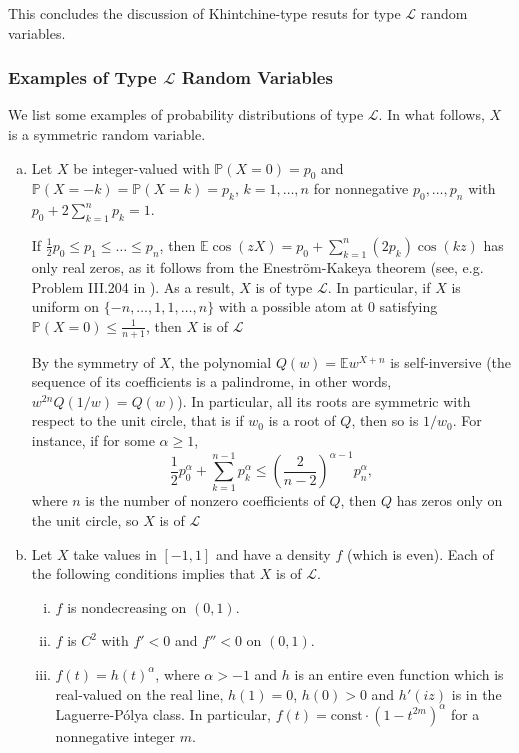 \documentclass[10pt]{article}
\newcommand{\E}{\mathbb{E}}
\newcommand{\1}{\textbf{1}}
\newcommand{\sL}{\mathcal{L}}
\newcommand{\p}[1]{\mathbb{P}\left( #1 \right)}
\theoremstyle{remark}
\theoremstyle{definition}
\begin{document}
This concludes the discussion of Khintchine-type resuts for type $\mathcal{L}$ random variables.

\subsubsection{Examples of Type $\mathcal{L}$ Random Variables}

We list some examples of probability distributions of type $\mathcal{L}$. In what follows, $X$ is a symmetric random variable.

\begin{enumerate}[(a)]

\item 
Let $X$ be integer-valued with $\p{X = 0} = p_0$ and $\p{X = -k} = \p{X = k} = p_k$, $k = 1, \dots, n$ for nonnegative $p_0, \dots, p_n$ with $p_0 + 2\sum_{k=1}^n p_k = 1$. 

If $\frac{1}{2}p_0 \leq p_1 \leq \dots \leq p_n$, then $\E \cos(zX) = p_0 + \sum_{k=1}^n (2p_k)\cos(kz)$ has only real zeros, as it follows from the Enestr\"om-Kakeya theorem (see, e.g. Problem III.204 in \cite{PS1}). As a result, $X$ is of type $\sL$. In particular, if $X$ is uniform on $\{-n,\dots, 1, 1, \dots, n\}$ with a possible atom at $0$ satisfying $\p{X = 0} \leq \frac{1}{n+1}$, then $X$ is of $\mathcal{L}$

By the symmetry of $X$, the polynomial $Q(w) = \E w^{X+n}$ is self-inversive (the sequence of its coefficients is a palindrome, in other words, $w^{2n}Q(1/w) = Q(w)$). In particular, all its roots are symmetric with respect to the unit circle, that is if $w_0$ is a root of $Q$, then so is $1/w_0$. For instance, if for some $\alpha \geq 1$,
\[
\frac{1}{2}p_0^\alpha + \sum_{k=1}^{n-1} p_k^\alpha \leq \left(\frac{2}{n-2}\right)^{\alpha-1}p_n^\alpha,
\]
where $n$ is the number of nonzero coefficients of $Q$, then $Q$ has zeros only on the unit circle, so $X$ is of $\mathcal{L}$

\item
Let $X$ take values in $[-1,1]$ and have a density $f$ (which is even). Each of the following conditions implies that $X$ is of $\mathcal{L}$.
\begin{enumerate}[(i)]
\item $f$ is  nondecreasing on $(0,1)$.

\item $f$ is $C^2$ with $f' < 0$ and $f'' < 0$ on $(0,1)$.

\item $f(t) = h(t)^{\alpha}$, where $\alpha > -1$ and $h$ is an entire even function which is real-valued on the real line, $h(1) = 0$, $h(0) > 0$ and $h'(iz)$ is  in the Laguerre-P\'olya class. In particular, $f(t) = \text{const}\cdot (1-t^{2m})^{\alpha}$ for a nonnegative integer $m$.  
\end{enumerate}


\end{enumerate}
\end{document}
